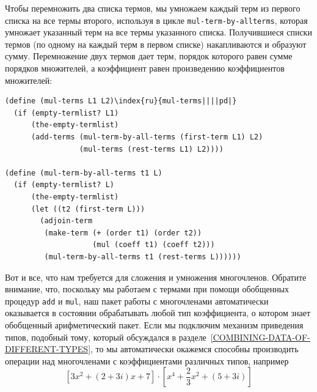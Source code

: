 Чтобы перемножить два списка термов, мы умножаем каждый
терм из первого списка на все термы второго, используя в цикле
{\tt mul-term-by-all\-terms}, которая умножает указанный терм на
все термы указанного списка.  Получившиеся списки термов (по одному на
каждый терм в первом списке) накапливаются и образуют сумму. Перемножение двух
термов дает терм, порядок которого равен сумме порядков множителей, а
коэффициент равен произведению коэффициентов множителей:

\begin{Verbatim}[fontsize=\small]
(define (mul-terms L1 L2)\index{ru}{mul-terms||||pd|}
  (if (empty-termlist? L1)
      (the-empty-termlist)
      (add-terms (mul-term-by-all-terms (first-term L1) L2)
                 (mul-terms (rest-terms L1) L2))))

(define (mul-term-by-all-terms t1 L)
  (if (empty-termlist? L)
      (the-empty-termlist)
      (let ((t2 (first-term L)))
        (adjoin-term
         (make-term (+ (order t1) (order t2))
                    (mul (coeff t1) (coeff t2)))
         (mul-term-by-all-terms t1 (rest-terms L))))))
\end{Verbatim}

Вот и все, что нам требуется для сложения и умножения
многочленов.  Обратите внимание, что, поскольку мы работаем с термами
при помощи обобщенных процедур {\tt add} и {\tt mul},
наш пакет работы с многочленами автоматически оказывается в состоянии
обрабатывать любой тип коэффициента, о котором знает обобщенный
арифметический пакет.  Если мы подключим механизм  приведения типов,
подобный тому, который обсуждался в 
разделе~\ref{COMBINING-DATA-OF-DIFFERENT-TYPES}, то мы
автоматически окажемся способны производить операции над
многочленами с коэффициентами различных типов,
например
$$
[3x^2 + (2+3i)x + 7] \cdot [x^4 + \frac{2}{3} x^2 + (5+3i)]
$$

